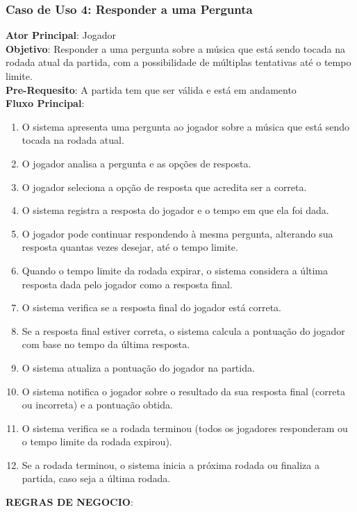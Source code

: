 \subsubsection{Caso de Uso 4: Responder a uma Pergunta}
    \textbf{Ator Principal}: Jogador  \\
    \textbf{Objetivo}: Responder a uma pergunta sobre a música que está sendo tocada na rodada atual da partida, com a possibilidade de múltiplas tentativas até o tempo limite. \\
    \textbf{Pre-Requesito}: A partida tem que ser válida e está em andamento \\
    \textbf{Fluxo Principal}: \\
    \begin{enumerate}
        \item O sistema apresenta uma pergunta ao jogador sobre a música que está sendo tocada na rodada atual.
        \item O jogador analisa a pergunta e as opções de resposta.
        \item O jogador seleciona a opção de resposta que acredita ser a correta.
        \item O sistema registra a resposta do jogador e o tempo em que ela foi dada.
        \item O jogador pode continuar respondendo à mesma pergunta, alterando sua resposta quantas vezes desejar, até o tempo limite.
        \item Quando o tempo limite da rodada expirar, o sistema considera a última resposta dada pelo jogador como a resposta final.
        \item O sistema verifica se a resposta final do jogador está correta.
        \item Se a resposta final estiver correta, o sistema calcula a pontuação do jogador com base no tempo da última resposta.
        \item O sistema atualiza a pontuação do jogador na partida.
        \item O sistema notifica o jogador sobre o resultado da sua resposta final (correta ou incorreta) e a pontuação obtida.
        \item O sistema verifica se a rodada terminou (todos os jogadores responderam ou o tempo limite da rodada expirou).
        \item Se a rodada terminou, o sistema inicia a próxima rodada ou finaliza a partida, caso seja a última rodada.
    \end{enumerate}
    \textbf{REGRAS DE NEGOCIO}:
